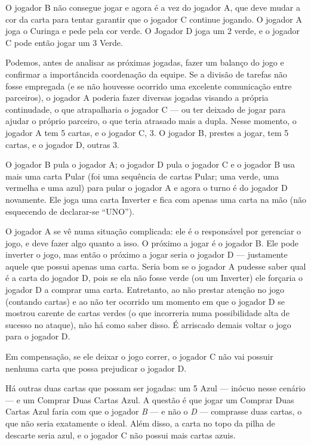 O jogador B não consegue jogar e agora é a vez do jogador A, que deve mudar a cor da carta para tentar garantir que o jogador C continue jogando. O jogador A joga o Curinga e pede pela cor verde. O Jogador D joga um 2 verde, e o jogador C pode então jogar um 3 Verde.

Podemos, antes de analisar as próximas jogadas, fazer um balanço do jogo e confirmar a importâncida coordenação da equipe. Se a divisão de tarefas não fosse empregada (e se não houvesse ocorrido uma excelente comunicação entre parceiros), o jogador A poderia fazer diversas jogadas visando a própria continudade, o que atrapalharia o jogador C --- ou ter deixado de jogar para ajudar o próprio parceiro, o que teria atrasado mais a dupla. Nesse momento, o jogador A tem 5 cartas, e o jogador C, 3. O jogador B, prestes a jogar, tem 5 cartas, e o jogador D, outras 3.

O jogador B pula o jogador A; o jogador D pula o jogador C e o jogador B usa mais uma carta Pular (foi uma sequência de cartas Pular; uma verde, uma vermelha e uma azul) para pular o jogador A e agora o turno é do jogador D novamente. Ele joga uma carta Inverter e fica com apenas uma carta na mão (não esquecendo de declarar-se ``UNO'').

O jogador A se vê numa situação complicada: ele é o responsável por gerenciar o jogo, e deve fazer algo quanto a isso. O próximo a jogar é o jogador B. Ele pode inverter o jogo, mas então o próximo a jogar seria o jogador D --- justamente aquele que possui apenas uma carta. Seria bom se o jogador A pudesse saber qual é a carta do jogador D, pois se ela não fosse verde (ou um Inverter) ele forçaria o jogador D a comprar uma carta. Entretanto, ao não prestar atenção no jogo (contando cartas) e ao não ter ocorrido um momento em que o jogador D se mostrou carente de cartas verdes (o que incorreria numa possibilidade alta de sucesso no ataque), não há como saber disso. É arriscado demais voltar o jogo para o jogador D.

Em compensação, se ele deixar o jogo correr, o jogador C não vai possuir nenhuma carta que possa prejudicar o jogador D.

Há outras duas cartas que possam ser jogadas: um 5 Azul --- inócuo nesse cenário --- e um Comprar Duas Cartas Azul. A questão é que jogar um Comprar Duas Cartas Azul faria com que o jogador \emph{B} --- e não o \emph{D} --- comprasse duas cartas, o que não seria exatamente o ideal. Além disso, a carta no topo da pilha de descarte seria azul, e o jogador C não possui mais cartas azuis.

